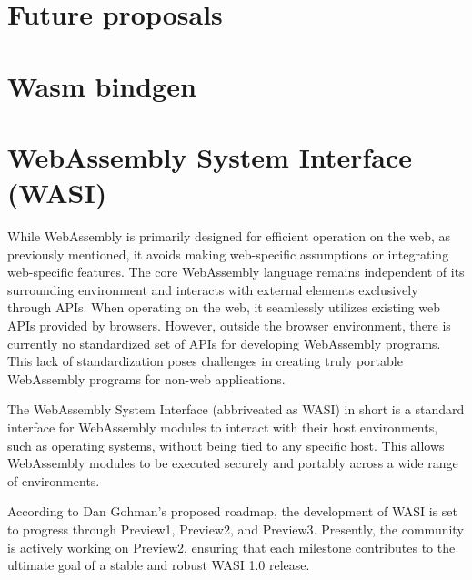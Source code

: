 \section{Future proposals}
\label{sec:future-proposals}

\section{Wasm bindgen}
\label{sec:wasm-bindgen}

\section{WebAssembly System Interface (WASI)}
\label{sec:wasi}
While WebAssembly is primarily designed for efficient operation on the web, as previously mentioned, it avoids making web-specific assumptions or integrating web-specific features. The core WebAssembly language remains independent of its surrounding environment and interacts with external elements exclusively through APIs. When operating on the web, it seamlessly utilizes existing web APIs provided by browsers. However, outside the browser environment, there is currently no standardized set of APIs for developing WebAssembly programs. This lack of standardization poses challenges in creating truly portable WebAssembly programs for non-web applications.

The WebAssembly System Interface (abbriveated as WASI) in short is a standard interface for WebAssembly modules to interact with their host environments, such as operating systems, without being tied to any specific host. This allows WebAssembly modules to be executed securely and portably across a wide range of environments. 

According to Dan Gohman's proposed roadmap, the development of WASI is set to progress through Preview1, Preview2, and Preview3. Presently, the community is actively working on Preview2, ensuring that each milestone contributes to the ultimate goal of a stable and robust WASI 1.0 release. 

